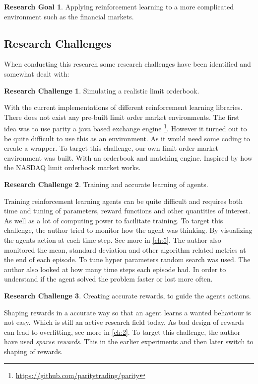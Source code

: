 \documentclass{kththesis}
\theoremstyle{definition}
\newtheorem{RG}{Research Goal}[section]
\newtheorem{RC}{Research Challenge}[section]
\begin{document}
\begin{RG}
Applying reinforcement learning to a more complicated environment such as the financial markets.
\end{RG}

\subsection{Research Challenges}
When conducting this research some research challenges have been identified and somewhat dealt with:
\begin{RC}
Simulating a realistic limit orderbook.
\end{RC}
With the current implementations of different reinforcement learning libraries. There does not exist any pre-built limit order market environments. The first idea was to use parity a java based exchange engine \footnote{\url{https://github.com/paritytrading/parity}}. However it turned out to be quite difficult to use this as an environment. As it would need some coding to create a wrapper. To target this challenge, our own limit order market environment was built. With an orderbook and matching engine. Inspired by how the NASDAQ limit orderbook market works.

\begin{RC}
Training and accurate learning of agents. 
\end{RC}

Training reinforcement learning agents can be quite difficult and requires both time and tuning of parameters, reward functions and other quantities of interest. 
\newpage
As well as a lot of computing power to facilitate training. To target this challenge, the author tried to monitor how the agent was thinking. By visualizing the agents action at each time-step. See more in \autoref{ch:5}. The author also monitored the mean, standard deviation and other algorithm related metrics at the end of each episode. To tune hyper parameters random search was used. The author also looked at how many time steps each episode had. In order to understand if the agent solved the problem faster or lost more often.

\begin{RC}
Creating accurate rewards, to guide the agents actions.
\end{RC}
Shaping rewards in a accurate way so that an agent learns a wanted behaviour is not easy. Which is still an active research field today. As bad design of rewards can lead to overfitting, see more in \autoref{ch:2}. To target this challenge, the author have used \textit{sparse rewards}. This in the earlier experiments and then later switch to shaping of rewards.
\end{document}
